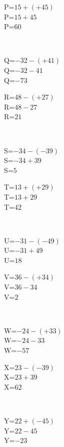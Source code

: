 \documentclass{article}%
\begin{document}
\begin{minipage}{0.5\textwidth}%
P=$15+(+45)$\\%
P=$15+45$\\%
P=$60$\\%
\end{minipage}%
\\%
\begin{minipage}{0.5\textwidth}%
Q=$-32-(+41)$\\%
Q=$-32-41$\\%
Q=$-73$\\%
\end{minipage}%
\begin{minipage}{0.5\textwidth}%
R=$48-(+27)$\\%
R=$48-27$\\%
R=$21$\\%
\end{minipage}%
\\%
\begin{minipage}{0.5\textwidth}%
S=$-34-(-39)$\\%
S=$-34+39$\\%
S=$5$\\%
\end{minipage}%
\begin{minipage}{0.5\textwidth}%
T=$13+(+29)$\\%
T=$13+29$\\%
T=$42$\\%
\end{minipage}%
\\%
\begin{minipage}{0.5\textwidth}%
U=$-31-(-49)$\\%
U=$-31+49$\\%
U=$18$\\%
\end{minipage}%
\begin{minipage}{0.5\textwidth}%
V=$36-(+34)$\\%
V=$36-34$\\%
V=$2$\\%
\end{minipage}%
\\%
\begin{minipage}{0.5\textwidth}%
W=$-24-(+33)$\\%
W=$-24-33$\\%
W=$-57$\\%
\end{minipage}%
\begin{minipage}{0.5\textwidth}%
X=$23-(-39)$\\%
X=$23+39$\\%
X=$62$\\%
\end{minipage}%
\\%
\begin{minipage}{0.5\textwidth}%
Y=$22+(-45)$\\%
Y=$22-45$\\%
Y=$-23$\\%
\end{minipage}

%
\end{document}
